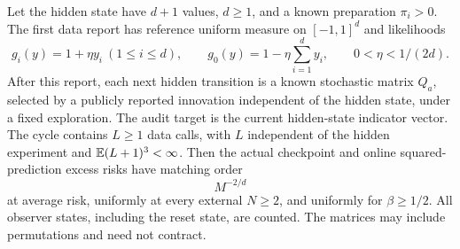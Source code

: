 \begin{theorem}\label{thm:hidden-geometry}
Let the hidden state have $d+1$ values, $d\ge1$, and a known preparation $\pi_i>0$. The first data report has reference uniform measure on $[-1,1]^d$ and likelihoods
\begin{equation}\label{eq:hidden-load}
 g_i(y)=1+\eta y_i\ (1\le i\le d),\qquad
 g_0(y)=1-\eta\sum_{i=1}^d y_i,\qquad 0<\eta<1/(2d).
\end{equation}
After this report, each next hidden transition is a known stochastic matrix $Q_a$, selected by a publicly reported innovation independent of the hidden state, under a fixed exploration. The audit target is the current hidden-state indicator vector. The cycle contains $L\ge1$ data calls, with $L$ independent of the hidden experiment and $\mathbb E(L+1)^3<\infty$. Then the actual checkpoint and online squared-prediction excess risks have matching order
\begin{equation}\label{eq:hidden-rate}
 M^{-2/d}
\end{equation}
at average risk, uniformly at every external $N\ge2$, and uniformly for $\beta\ge1/2$. All observer states, including the reset state, are counted. The matrices may include permutations and need not contract.
\end{theorem}
